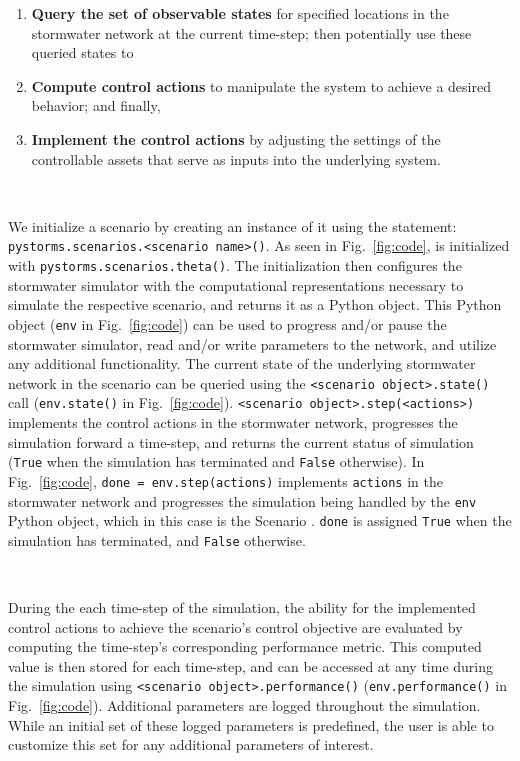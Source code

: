 %
\begin{enumerate}
	\item \label{query} \textbf{Query the set of observable states} for specified locations in the stormwater network at the current time-step; then potentially use these queried states to 
	\item \label{compute} \textbf{Compute control actions} to manipulate the system to achieve a desired behavior; and finally, 
	 \item \label{implement} \textbf{Implement the control actions} by adjusting the settings of the controllable assets that serve as inputs into the underlying system. 
\end{enumerate}

\

We initialize a \pystorms scenario by creating an instance of it using the statement:  \texttt{pystorms.scenarios.<scenario name>()}.
As seen in Fig.~\ref{fig:code},  is initialized with \texttt{pystorms.scenarios.theta()}.
The initialization then configures the stormwater simulator with the computational representations necessary to simulate the respective scenario, and returns it as a Python object. This Python object (\texttt{env} in Fig.~\ref{fig:code}) can be used to progress and/or pause the stormwater simulator, read and/or write parameters to the network, and utilize any additional \pystorms functionality. The current state of the underlying stormwater network in the scenario can be queried using the \texttt{<scenario object>.state()} call (\texttt{env.state()} in Fig.~\ref{fig:code}).
\texttt{<scenario object>.step(<actions>)} implements the control actions in the stormwater network, progresses the simulation forward a time-step, and returns the current status of simulation (\texttt{True} when the simulation has terminated and \texttt{False} otherwise). In Fig.~\ref{fig:code}, \texttt{done = env.step(actions)} implements \texttt{actions} in the stormwater network and progresses the simulation being handled by the \texttt{env} Python object, which in this case is the Scenario .
\texttt{done} is assigned \texttt{True} when the simulation has terminated, and \texttt{False} otherwise.


\

During the each time-step of the simulation, the ability for the implemented control actions to achieve the scenario's control objective are evaluated by computing the time-step's corresponding performance metric. This computed value is then stored for each time-step, and can be accessed at any time during the simulation using \texttt{<scenario object>.performance()} (\texttt{env.performance()} in Fig.~\ref{fig:code}). Additional parameters are logged throughout the simulation. While an initial set of these logged parameters is predefined, the user is able to customize this set for any additional parameters of interest. 

